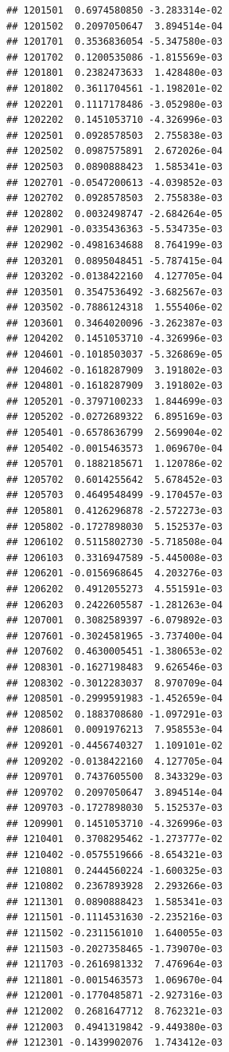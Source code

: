 \documentclass[ignorenonframetext,]{beamer}
\begin{document}
\begin{frame}[fragile]
\begin{verbatim}
## 1201501  0.6974580850 -3.283314e-02
## 1201502  0.2097050647  3.894514e-04
## 1201701  0.3536836054 -5.347580e-03
## 1201702  0.1200535086 -1.815569e-03
## 1201801  0.2382473633  1.428480e-03
## 1201802  0.3611704561 -1.198201e-02
## 1202201  0.1117178486 -3.052980e-03
## 1202202  0.1451053710 -4.326996e-03
## 1202501  0.0928578503  2.755838e-03
## 1202502  0.0987575891  2.672026e-04
## 1202503  0.0890888423  1.585341e-03
## 1202701 -0.0547200613 -4.039852e-03
## 1202702  0.0928578503  2.755838e-03
## 1202802  0.0032498747 -2.684264e-05
## 1202901 -0.0335436363 -5.534735e-03
## 1202902 -0.4981634688  8.764199e-03
## 1203201  0.0895048451 -5.787415e-04
## 1203202 -0.0138422160  4.127705e-04
## 1203501  0.3547536492 -3.682567e-03
## 1203502 -0.7886124318  1.555406e-02
## 1203601  0.3464020096 -3.262387e-03
## 1204202  0.1451053710 -4.326996e-03
## 1204601 -0.1018503037 -5.326869e-05
## 1204602 -0.1618287909  3.191802e-03
## 1204801 -0.1618287909  3.191802e-03
## 1205201 -0.3797100233  1.844699e-03
## 1205202 -0.0272689322  6.895169e-03
## 1205401 -0.6578636799  2.569904e-02
## 1205402 -0.0015463573  1.069670e-04
## 1205701  0.1882185671  1.120786e-02
## 1205702  0.6014255642  5.678452e-03
## 1205703  0.4649548499 -9.170457e-03
## 1205801  0.4126296878 -2.572273e-03
## 1205802 -0.1727898030  5.152537e-03
## 1206102  0.5115802730 -5.718508e-04
## 1206103  0.3316947589 -5.445008e-03
## 1206201 -0.0156968645  4.203276e-03
## 1206202  0.4912055273  4.551591e-03
## 1206203  0.2422605587 -1.281263e-04
## 1207001  0.3082589397 -6.079892e-03
## 1207601 -0.3024581965 -3.737400e-04
## 1207602  0.4630005451 -1.380653e-02
## 1208301 -0.1627198483  9.626546e-03
## 1208302 -0.3012283037  8.970709e-04
## 1208501 -0.2999591983 -1.452659e-04
## 1208502  0.1883708680 -1.097291e-03
## 1208601  0.0091976213  7.958553e-04
## 1209201 -0.4456740327  1.109101e-02
## 1209202 -0.0138422160  4.127705e-04
## 1209701  0.7437605500  8.343329e-03
## 1209702  0.2097050647  3.894514e-04
## 1209703 -0.1727898030  5.152537e-03
## 1209901  0.1451053710 -4.326996e-03
## 1210401  0.3708295462 -1.273777e-02
## 1210402 -0.0575519666 -8.654321e-03
## 1210801  0.2444560224 -1.600325e-03
## 1210802  0.2367893928  2.293266e-03
## 1211301  0.0890888423  1.585341e-03
## 1211501 -0.1114531630 -2.235216e-03
## 1211502 -0.2311561010  1.640055e-03
## 1211503 -0.2027358465 -1.739070e-03
## 1211703 -0.2616981332  7.476964e-03
## 1211801 -0.0015463573  1.069670e-04
## 1212001 -0.1770485871 -2.927316e-03
## 1212002  0.2681647712  8.762321e-03
## 1212003  0.4941319842 -9.449380e-03
## 1212301 -0.1439902076  1.743412e-03

\end{verbatim}
\end{frame}
\end{document}
